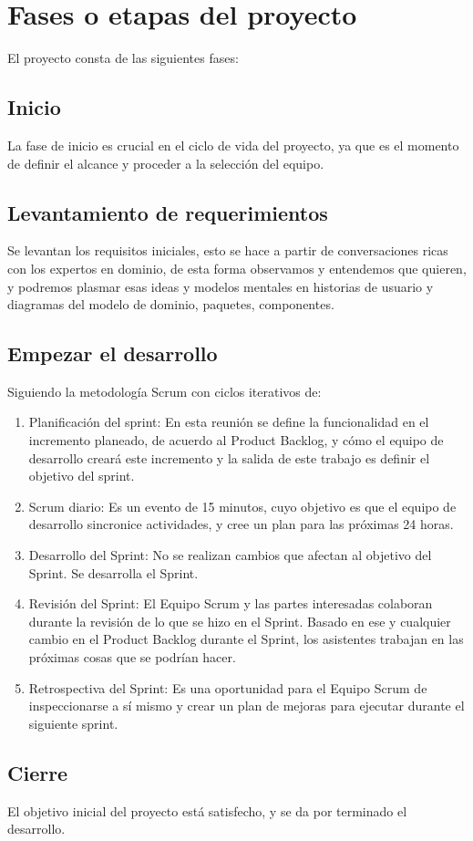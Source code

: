 \documentclass{article}
\begin{document}
\section{Fases o etapas del proyecto}
El proyecto consta de las siguientes fases:

\subsection{Inicio}
La fase de inicio es crucial en el ciclo de vida del proyecto, ya que es el momento de definir el alcance y proceder a la selección del equipo.

\subsection{Levantamiento de requerimientos}
Se levantan los requisitos iniciales, esto se hace a partir de conversaciones ricas con los expertos en dominio, de esta forma observamos y entendemos que quieren, y podremos plasmar esas ideas y modelos mentales en historias de usuario y diagramas del modelo de dominio, paquetes, componentes.

\subsection{Empezar el desarrollo}
Siguiendo la metodología Scrum con ciclos iterativos de:
\begin{enumerate}
    \item Planificación del sprint: En esta reunión se define la funcionalidad en el incremento planeado, de acuerdo al Product Backlog, y cómo el equipo de desarrollo creará este incremento y la salida de este trabajo es definir el objetivo del sprint.
    \item Scrum diario: Es un evento de 15 minutos, cuyo objetivo es que el equipo de desarrollo sincronice actividades, y cree un plan para las próximas 24 horas.
    \item Desarrollo del Sprint: No se realizan cambios que afectan al objetivo del Sprint. Se desarrolla el Sprint.
    \item Revisión del Sprint: El Equipo Scrum y las partes interesadas colaboran durante la revisión de lo que se hizo en el Sprint. Basado en ese y cualquier cambio en el Product Backlog durante el Sprint, los asistentes trabajan en las próximas cosas que se podrían hacer.
    \item Retrospectiva del Sprint: Es una oportunidad para el Equipo Scrum de inspeccionarse a sí mismo y crear un plan de mejoras para ejecutar durante el siguiente sprint.
\end{enumerate}

\subsection{Cierre}
El objetivo inicial del proyecto está satisfecho, y se da por terminado el desarrollo.
\end{document}

